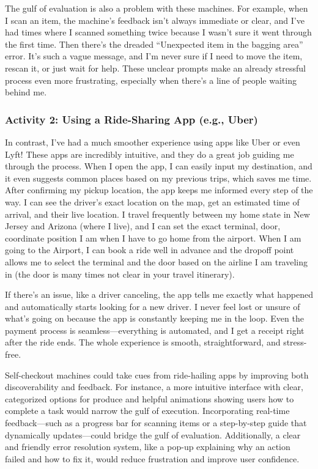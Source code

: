 \documentclass[
	letterpaper, %
]{jdf}
\begin{document}
The gulf of evaluation is also a problem with these machines. For example, when I scan an item, the machine’s feedback isn’t always immediate or clear, and I’ve had times where I scanned something twice because I wasn’t sure it went through the first time. Then there’s the dreaded “Unexpected item in the bagging area” error. It’s such a vague message, and I’m never sure if I need to move the item, rescan it, or just wait for help. These unclear prompts make an already stressful process even more frustrating, especially when there’s a line of people waiting behind me. 

\subsubsection {Activity 2: Using a Ride-Sharing App (e.g., Uber)}
In contrast, I’ve had a much smoother experience using apps like Uber or even Lyft! These apps are incredibly intuitive, and they do a great job guiding me through the process. When I open the app, I can easily input my destination, and it even suggests common places based on my previous trips, which saves me time. After confirming my pickup location, the app keeps me informed every step of the way. I can see the driver’s exact location on the map, get an estimated time of arrival, and their live location. I travel frequently between my home state in New Jersey and Arizona (where I live), and I can set the exact terminal, door, coordinate position I am when I have to go home from the airport. When I am going to the Airport, I can book a ride well in advance and the dropoff point allows me to select the terminal and the door based on the airline I am traveling in (the door is many times not clear in your travel itinerary).

If there’s an issue, like a driver canceling, the app tells me exactly what happened and automatically starts looking for a new driver. I never feel lost or unsure of what’s going on because the app is constantly keeping me in the loop. Even the payment process is seamless—everything is automated, and I get a receipt right after the ride ends. The whole experience is smooth, straightforward, and stress-free.

Self-checkout machines could take cues from ride-hailing apps by improving both discoverability and feedback. For instance, a more intuitive interface with clear, categorized options for produce and helpful animations showing users how to complete a task would narrow the gulf of execution. Incorporating real-time feedback—such as a progress bar for scanning items or a step-by-step guide that dynamically updates—could bridge the gulf of evaluation. Additionally, a clear and friendly error resolution system, like a pop-up explaining why an action failed and how to fix it, would reduce frustration and improve user confidence.
\newpage
\end{document}
